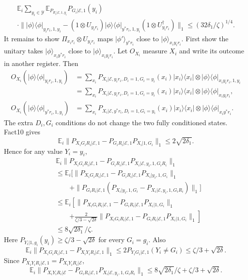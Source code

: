 \documentclass[10pt,a4paper]{article}
\providecommand{\ket}[1]{\lvert#1\rangle}
\providecommand{\bra}[1]{\langle#1\rvert}
\providecommand{\proj}[1]{\ket{#1}\bra{#1}}
\begin{document}
\begin{multline*}\mathbb E_i\sum_{y_i\in\mathcal Y}\mathbb E_{P_{R_i|\mathcal E,1,y_i}}P_{G_i|\mathcal E,1}(y_i)\\\cdot\|\proj\phi_{y_ir_i,1,y_i}-(1\otimes U_{y_ir_i})\proj\phi_{y^*r_i,1,y_i}(1\otimes U_{y_ir_i}^\dagger)\|_1\le(32\delta_1/\zeta)^{1/4}.\tag{16}\end{multline*}
It remains to show $\Pi_{x_ir_i}\otimes U_{y_ir_i}$ maps $\ket{\phi'}_{y^*r_i}$ close to $\ket\phi_{x_iy_ir_i}$. First show the unitary takes $\ket\phi_{x_iy^*r_i}$ close to $\ket\phi_{x_iy_ir_i}$. Let $O_{X_i}$ measure $X_i$ and write its outcome in another register. Then
\begin{align*}O_{X_i}(\proj\phi_{y_ir_i,1,y_i})&=\sum_{x_i}P_{X_i|\mathcal E,y_ir_i,D_i=1,G_i=y_i}(x_i)\proj{x_i}\otimes\proj\phi_{x_iy_ir_i,1,y_i}\\&=\sum_{x_i}P_{X_i|\mathcal E,y_ir_i,D_i=1,G_i=y_i}(x_i)\proj{x_i}\otimes\proj\phi_{x_iy_ir_i},\\O_{X_i}(\proj\phi_{y^*r_i,1,y_i})&=\sum_{x_i}P_{X_i|\mathcal E,y^*r_i,D_i=1,G_i=y_i}(x_i)\proj{x_i}\otimes\proj\phi_{x_iy^*r_i}.\end{align*}
The extra $D_i,G_i$ conditions do not change the two fully conditioned states. Fact10 gives
\[\mathbb E_i\|P_{X_iG_iR_i|\mathcal E,1}-P_{G_iR_i|\mathcal E,1}P_{X_i|1,G_i}\|_1\le2\sqrt{2\delta_1}.\]
Hence for any value $Y_i=y_i$,
\begin{align*}&\mathbb E_i\|P_{X_iG_iR_i|\mathcal E,1}-P_{G_iR_i|\mathcal E,1}P_{X_i|\mathcal E,y_i,1,G_iR_i}\|_1\\&\le\mathbb E_i[\|P_{X_iG_iR_i|\mathcal E,1}-P_{G_iR_i|\mathcal E,1}P_{X_i|y_i,1,G_i}\|_1\\&\qquad+\|P_{G_iR_i|\mathcal E,1}(P_{X_i|y_i,1,G_i}-P_{X_i|\mathcal E,y_i,1,G_iR_i})\|_1]\\&\le\mathbb E_i\left[\|P_{X_iG_iR_i|\mathcal E,1}-P_{G_iR_i|\mathcal E,1}P_{X_i|1,G_i}\|_1\right.\\&\qquad\left.+\frac2{\zeta/3-\sqrt{2\delta}}\|P_{X_iG_iR_i|\mathcal E,1}-P_{G_iR_i|\mathcal E,1}P_{X_i|1,G_i}\|_1\right]\\&\le8\sqrt{2\delta_1}/\zeta.
\end{align*}
Here $P_{Y_i|1,g_i}(y_i)\ge\zeta/3-\sqrt{2\delta}$ for every $G_i=g_i$. Also
\[\mathbb E_i\|P_{X_iG_iR_i|\mathcal E,1}-P_{X_iY_iR_i|\mathcal E,1}\|_1\le2P_{Y_iG_i|\mathcal E,1}(Y_i\ne G_i)\le\zeta/3+\sqrt{2\delta}.\]
Since $P_{X_iY_iR_i|\mathcal E,1}=P_{X_iY_iR_i|\mathcal E}$,
\[\mathbb E_i\|P_{X_iY_iR_i|\mathcal E}-P_{G_iR_i|\mathcal E,1}P_{X_i|\mathcal E,y_i,1,G_iR_i}\|_1\le8\sqrt{2\delta_1}/\zeta+\zeta/3+\sqrt{2\delta}.\]
\end{document}
